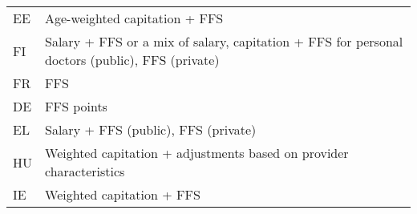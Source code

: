 \documentclass[ngerman,a4paper]{article}
\begin{document}
\begin{longtable}[c]{@{}ll@{}}
\begin{minipage}[t]{0.08\columnwidth}\raggedright\strut
EE
\strut\end{minipage} &
\begin{minipage}[t]{0.86\columnwidth}\raggedright\strut
Age-weighted capitation + FFS
\strut\end{minipage}\tabularnewline
\begin{minipage}[t]{0.08\columnwidth}\raggedright\strut
FI
\strut\end{minipage} &
\begin{minipage}[t]{0.86\columnwidth}\raggedright\strut
Salary + FFS or a mix of salary, capitation + FFS for personal doctors
(public), FFS (private)
\strut\end{minipage}\tabularnewline
\begin{minipage}[t]{0.08\columnwidth}\raggedright\strut
FR
\strut\end{minipage} &
\begin{minipage}[t]{0.86\columnwidth}\raggedright\strut
FFS
\strut\end{minipage}\tabularnewline
\begin{minipage}[t]{0.08\columnwidth}\raggedright\strut
DE
\strut\end{minipage} &
\begin{minipage}[t]{0.86\columnwidth}\raggedright\strut
FFS points
\strut\end{minipage}\tabularnewline
\begin{minipage}[t]{0.08\columnwidth}\raggedright\strut
EL
\strut\end{minipage} &
\begin{minipage}[t]{0.86\columnwidth}\raggedright\strut
Salary + FFS (public), FFS (private)
\strut\end{minipage}\tabularnewline
\begin{minipage}[t]{0.08\columnwidth}\raggedright\strut
HU
\strut\end{minipage} &
\begin{minipage}[t]{0.86\columnwidth}\raggedright\strut
Weighted capitation + adjustments based on provider characteristics
\strut\end{minipage}\tabularnewline
\begin{minipage}[t]{0.08\columnwidth}\raggedright\strut
IE
\strut\end{minipage} &
\begin{minipage}[t]{0.86\columnwidth}\raggedright\strut
Weighted capitation + FFS
\strut\end{minipage}\tabularnewline

\end{longtable}
\end{document}
